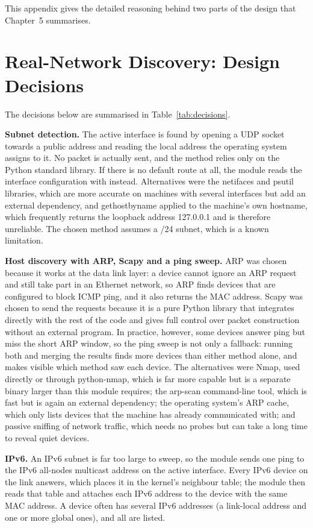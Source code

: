 This appendix gives the detailed reasoning behind two parts of the design
that Chapter~5 summarises.

\section{Real-Network Discovery: Design Decisions}
\label{app:scan}

The decisions below are summarised in Table~\ref{tab:decisions}.

\textbf{Subnet detection.} The active interface is found by opening a UDP
socket towards a public address and reading the local address the operating
system assigns to it. No packet is actually sent, and the method relies only
on the Python standard library. If there is no default route at all, the
module reads the interface configuration with  instead.
Alternatives were the netifaces and psutil libraries, which are more accurate
on machines with several interfaces but add an external dependency, and
gethostbyname applied to the machine's own hostname, which frequently returns
the loopback address 127.0.0.1 and is therefore unreliable. The chosen method
assumes a /24 subnet, which is a known limitation.

\textbf{Host discovery with ARP, Scapy and a ping sweep.} ARP was chosen
because it works at the data link layer: a device cannot ignore an ARP
request and still take part in an Ethernet network, so ARP finds devices that
are configured to block ICMP ping, and it also returns the MAC address. Scapy
was chosen to send the requests because it is a pure Python library that
integrates directly with the rest of the code and gives full control over
packet construction without an external program. In practice, however, some
devices answer ping but miss the short ARP window, so the ping sweep is not
only a fallback: running both and merging the results finds more devices than
either method alone, and  makes visible which method saw each
device. The alternatives were Nmap, used directly or through python-nmap,
which is far more capable but is a separate binary larger than this module
requires; the arp-scan command-line tool, which is fast but is again an
external dependency; the operating system's ARP cache, which only lists
devices that the machine has already communicated with; and passive sniffing
of network traffic, which needs no probes but can take a long time to reveal
quiet devices.

\textbf{IPv6.} An IPv6 subnet is far too large to sweep, so the module sends
one ping to the IPv6 all-nodes multicast address on the active interface. Every
IPv6 device on the link answers, which places it in the kernel's neighbour
table; the module then reads that table and attaches each IPv6 address to the
device with the same MAC address. A device often has several IPv6 addresses
(a link-local  address and one or more global ones), and all are
listed.

